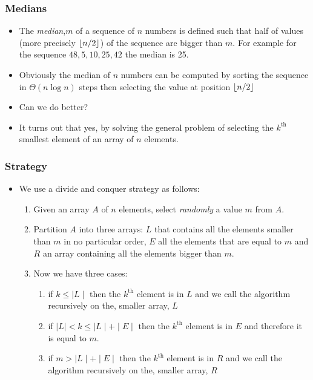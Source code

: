 \documentclass{beamer}
\DeclarePairedDelimiter\floor{\lfloor}{\rfloor}
\begin{document}
\begin{frame}
  \frametitle{Medians}
  \begin{itemize}
  \item The \textit{median},$m$ of a sequence of $n$ numbers is defined such that half of values (more precisely $\floor*{n/2}$) of the sequence are bigger than $m$. For example
  for the sequence $48,5,10,25,42$ the median is 25.
  \item Obviously the median of $n$ numbers can be computed by sorting the sequence in $\Theta(n\log n)$ steps then selecting the value at position $\floor*{n/2}$
  \item Can we do better?
  \item It turns out that yes, by solving the general problem of selecting the $k^{\text{th}}$ smallest element of an array of $n$ elements.
  \end{itemize}
\end{frame}

\begin{frame}
  \frametitle{Strategy}
  \begin{itemize}
  \item We use a divide and conquer strategy as follows:
    \begin{enumerate}
    \item Given an array $A$ of $n$ elements, select \textit{randomly} a value $m$ from $A$.
    \item Partition $A$ into three arrays: $L$ that contains all the elements smaller than $m$ in no particular order, $E$ all the elements
    that are equal to $m$ and $R$ an array containing all the elements bigger than $m$.
  \item Now we have three cases:
    \begin{enumerate}
   \item if $k\le \mid L\mid $ then the $k^{\text{th}}$ element is in $L$ and we call the algorithm recursively on the, smaller array, $L$
    \item if $\mid L\mid < k\le \mid L\mid +\mid E\mid$ then the $k^{\text{th}}$ element is in $E$ and therefore it is equal to $m$.
  \item  if $m > \mid L\mid +\mid E\mid $ then the $k^{\text{th}}$ element is in $R$ and we call the algorithm recursively on the, smaller array, $R$
    \end{enumerate}
    \end{enumerate}
  \end{itemize}
\end{frame}
\end{document}
